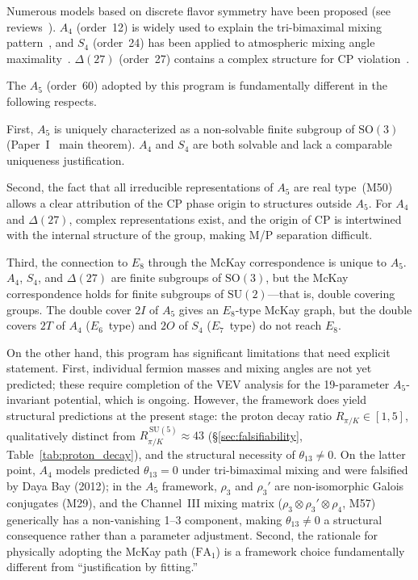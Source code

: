 \documentclass[sn-mathphys-num,Numbered]{sn-jnl}
\theoremstyle{thmstyleone}
\theoremstyle{thmstylethree}
\newcommand{\SU}{\mathrm{SU}}
\newcommand{\SO}{\mathrm{SO}}
\begin{document}
Numerous models based on discrete flavor symmetry have been proposed (see
reviews~\cite{Feruglio2015,KingLuhn2013}).  $A_4$ (order~12) is widely used to
explain the tri-bimaximal mixing pattern~\cite{Ma2001,AltarelliFeruglio2006},
and $S_4$ (order~24) has been applied to atmospheric mixing angle
maximality~\cite{Lam2008}.  $\Delta(27)$ (order~27) contains a complex
structure for CP violation~\cite{LuhnNasriRamond2007}.

The $A_5$ (order~60) adopted by this program is fundamentally different in the
following respects.

First, $A_5$ is uniquely characterized as a non-solvable finite subgroup of
$\SO(3)$ (Paper~I~\cite{Paper1} main theorem).  $A_4$ and $S_4$ are both
solvable and lack a comparable uniqueness justification.

Second, the fact that all irreducible representations of $A_5$ are real
type~(M50) allows a clear attribution of the CP phase origin to structures
outside $A_5$.  For $A_4$ and $\Delta(27)$, complex representations exist, and
the origin of CP is intertwined with the internal structure of the group,
making M/P separation difficult.

Third, the connection to $E_8$ through the McKay correspondence is unique to
$A_5$.  $A_4$, $S_4$, and $\Delta(27)$ are finite subgroups of $\SO(3)$, but
the McKay correspondence holds for finite subgroups of $\SU(2)$---that is,
double covering groups.  The double cover $2I$ of $A_5$ gives an $E_8$-type
McKay graph, but the double covers $2T$ of $A_4$ ($E_6$~type) and $2O$ of
$S_4$ ($E_7$~type) do not reach $E_8$.

On the other hand, this program has significant limitations that need explicit
statement.  First, individual fermion masses and mixing angles are not yet
predicted; these require completion of the VEV analysis for the 19-parameter
$A_5$-invariant potential, which is ongoing.  However, the framework does yield
structural predictions at the present stage: the proton decay ratio
$R_{\pi/K} \in [1,5]$, qualitatively distinct from
$R_{\pi/K}^{\,\SU(5)} \approx 43$
(\S\ref{sec:falsifiability}, Table~\ref{tab:proton_decay}),
and the structural necessity of $\theta_{13} \neq 0$.
On the latter point, $A_4$ models predicted $\theta_{13} = 0$ under
tri-bimaximal mixing and were falsified by Daya Bay (2012);
in the $A_5$ framework, $\rho_3$ and $\rho_3'$ are non-isomorphic
Galois conjugates (M29), and the Channel~III mixing matrix
($\rho_3 \otimes \rho_3' \otimes \rho_4$, M57) generically has a non-vanishing
1--3 component, making $\theta_{13} \neq 0$ a structural consequence
rather than a parameter adjustment.
Second, the rationale for physically adopting the McKay path
($\mathrm{FA}_1$) is a framework choice fundamentally different from
``justification by fitting.''
\end{document}
